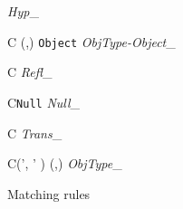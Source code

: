 \begin{figure}
{\emph{Hyp}_{\leI}} 

 {C\vdash
\Tobj(\MT,\tau ) \leI \texttt{Object}}
{}{\emph{ObjType-Object}_{\leI}}

 {C\vdash \tau \leI \tau }
{}{\emph{Refl}_{\leI}}

 {C\vdash \texttt{Null}
\leI \tau } {}{\emph{Null}_{\leI}}

{C\vdash \sigma \leI \gamma } {}{\emph{Trans}_{\leI}}

{C\vdash \Tobj(\MT', \tau' ) \leI \Tobj(\MT,\tau )}
{}{\emph{ObjType}_{\leI}}
\caption{Matching rules}\label{fig::matching}
\end{figure}